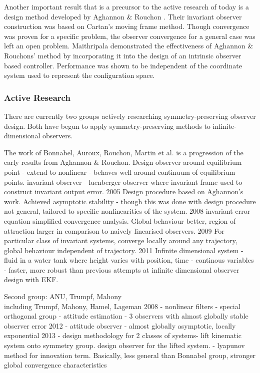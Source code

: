 Another important result that is a precursor to the active research of today is a design method developed by Aghannon \& Rouchon \cite{aghannan2002invariant}. Their invariant observer construction was based on Cartan's moving frame method. Though convergence was proven for a specific problem, the observer convergence for a general case was left an open problem. Maithripala \cite{maithripala2005intrinsic} demonstrated the effectiveness of Aghannon \& Rouchons' method by incorporating it into the design of an intrinsic observer based controller. Performance was shown to be independent of the coordinate system used to represent the configuration space.

\subsubsection{Active Research}
There are currently two groups actively researching symmetry-preserving observer design.  Both have begun to apply symmetry-preserving methods to infinite-dimensional observers.

The work of Bonnabel, Auroux, Rouchon, Martin et al. is a progression of the early results from Aghannon \& Rouchon. 
Design observer around equilibrium point - extend to nonlinear - behaves well around continuum of equilibrium points. 
invariant observer - luenberger observer where invariant frame used to construct invariant output error.
2005 \cite{bonnabel2005invariant} Design procedure based on Aghannon's work. Achieved asymptotic stability - though this was done with design procedure not general, tailored to specific nonlinearities of the system.
2008 \cite{bonnabel2008symmetry} invariant error equation simplified convergence analysis. Global behaviour better, region of attraction larger in comparison to naively linearised observers.
2009 \cite{bonnabel2009non} For particular class of invariant systems, converge locally around any trajectory, global behaviour independent of trajectory.
2011 \cite{auroux2011symmetry} Infinite dimensional system - fluid in a water tank where height varies with position, time - continous variables - faster, more robust than previous attempts at infinite dimensional observer design with EKF.

Second group: ANU, Trumpf, Mahony\\
including Trumpf, Mahony, Hamel, Lageman
2008 \cite{mahony2009nonlinear} - nonlinear filters - special orthogonal group - attitude estimation - 3 observers with almost globally stable observer error
2012 \cite{trumpf2012analysis} - attitude observer - almost globally asymptotic, locally exponential
2013 \cite{mahony2013observers} - design methodology for 2 classes of systems- lift kinematic system onto symmetry group. design observer for the lifted system. - lyapunov method for innovation term. Basically, less general than Bonnabel group, stronger global convergence characteristics

